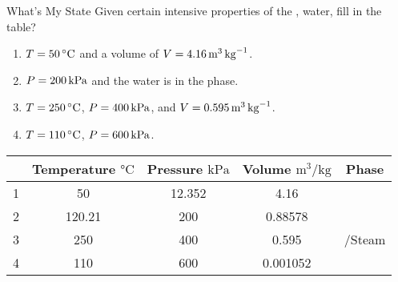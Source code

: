 \begin{example}[Problem 4.23]{What's My State}
  Given certain intensive properties of the , water, fill in the table?
  \begin{enumerate}[noitemsep]
  \item $\Temp = \SI{50}{\degreeCelsius}$ and a volume of $V = \SI{4.16}{\meter\cubed\per\kilo\gram}$.
  \item $P = \SI{200}{\kilo\pascal}$ and the water is in the  phase.
  \item $\Temp = \SI{250}{\degreeCelsius}$, $P = \SI{400}{\kilo\pascal}$, and $V = \SI{0.595}{\meter\cubed\per\kilo\gram}$.
  \item $\Temp = \SI{110}{\degreeCelsius}$, $P = \SI{600}{\kilo\pascal}$.
  \end{enumerate}
  \tcblower{}
  \begin{center}
    \begin{tabular}{ccccc}
      \toprule
      & Temperature $\si{\degreeCelsius}$ & Pressure $\si{\kilo\pascal}$ & Volume $\si{\meter\cubed\per\kilo\gram}$ & Phase \\
      \midrule
      1 & 50 & 12.352 & 4.16 & \nameref{def:Saturated_Mixture} \\
      2 & 120.21 & 200 & 0.88578 & \nameref{def:Saturated_Vapor} \\
      3 & 250 & 400 & 0.595 & \nameref{def:Superheated_Vapor}/Steam \\
      4 & 110 & 600 & 0.001052 & \nameref{def:Compressed_Liquid} \\
      \bottomrule
    \end{tabular}
  \end{center}


\end{example}
